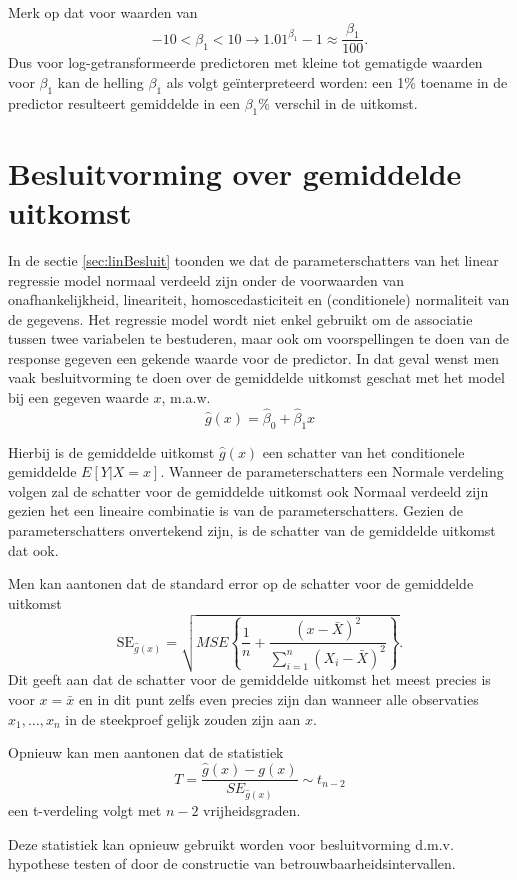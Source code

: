 \documentclass[12pt,dutch,coursenotes]{book}
\theoremstyle{definition}
\theoremstyle{definition}
\theoremstyle{definition}
\theoremstyle{remark}
\begin{document}
Merk op dat voor waarden van
\[−10< \beta_1<10 \rightarrow 1.01 ^{\beta_1}−1 \approx \frac{\beta_1}{100}.\]
Dus voor log-getransformeerde predictoren met kleine tot gematigde
waarden voor \(\beta_1\) kan de helling \(\beta_1\) als volgt
geïnterpreteerd worden: een 1\% toename in de predictor resulteert
gemiddelde in een \(\beta_1\)\% verschil in de uitkomst.

\section{Besluitvorming over gemiddelde
uitkomst}\label{besluitvorming-over-gemiddelde-uitkomst}

In de sectie \ref{sec:linBesluit} toonden we dat de parameterschatters
van het linear regressie model normaal verdeeld zijn onder de
voorwaarden van onafhankelijkheid, lineariteit, homoscedasticiteit en
(conditionele) normaliteit van de gegevens. Het regressie model wordt
niet enkel gebruikt om de associatie tussen twee variabelen te
bestuderen, maar ook om voorspellingen te doen van de response gegeven
een gekende waarde voor de predictor. In dat geval wenst men vaak
besluitvorming te doen over de gemiddelde uitkomst geschat met het model
bij een gegeven waarde \(x\), m.a.w.
\[\hat{g}(x)= \hat{\beta}_0 + \hat{\beta}_1 x\]

Hierbij is de gemiddelde uitkomst \(\hat{g}(x)\) een schatter van het
conditionele gemiddelde \(E[Y\vert X=x]\). Wanneer de parameterschatters
een Normale verdeling volgen zal de schatter voor de gemiddelde uitkomst
ook Normaal verdeeld zijn gezien het een lineaire combinatie is van de
parameterschatters. Gezien de parameterschatters onvertekend zijn, is de
schatter van de gemiddelde uitkomst dat ook.

Men kan aantonen dat de standard error op de schatter voor de gemiddelde
uitkomst
\[\text{SE}_{\hat{g}(x)}=\sqrt{MSE\left\{\frac{1}{n}+\frac{(x-\bar X)^2}{\sum\limits_{i=1}^n (X_i-\bar X)^2}\right\}}.\]
Dit geeft aan dat de schatter voor de gemiddelde uitkomst het meest
precies is voor \(x=\bar x\) en in dit punt zelfs even precies zijn dan
wanneer alle observaties \(x_1,\ldots, x_n\) in de steekproef gelijk
zouden zijn aan \(x\).

Opnieuw kan men aantonen dat de statistiek
\[T=\frac{\hat{g}(x)-g(x)}{SE_{\hat{g}(x)}}\sim t_{n-2}\] een
t-verdeling volgt met \(n-2\) vrijheidsgraden.

Deze statistiek kan opnieuw gebruikt worden voor besluitvorming d.m.v.
hypothese testen of door de constructie van betrouwbaarheidsintervallen.
\end{document}
